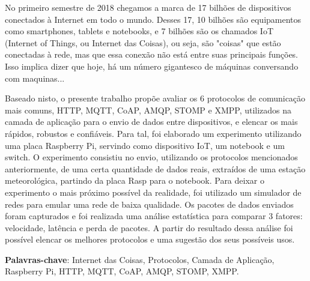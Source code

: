 \setlength{\absparsep}{18pt} %
\begin{resumo}
 
No primeiro semestre de 2018 chegamos a marca de 17 bilhões de dispositivos conectados à Internet em todo o mundo. Desses 17, 10 bilhões são equipamentos como smartphones, tablets e notebooks, e 7 bilhões são os chamados IoT (Internet of Things, ou Internet das Coisas), ou seja, são "coisas" que estão conectadas à rede, mas que essa conexão não está entre suas principais funções. Isso implica dizer que hoje, há um número gigantesco de máquinas conversando com maquinas...

Baseado nisto, o presente trabalho propõe avaliar os 6 protocolos de comunicação mais comuns, HTTP, MQTT, CoAP, AMQP, STOMP e XMPP, utilizados na camada de aplicação para o envio de dados entre dispositivos, e elencar os mais rápidos, robustos e confiáveis. Para tal, foi elaborado um experimento utilizando uma placa Raspberry Pi, servindo como dispositivo IoT, um notebook e um switch. O experimento consistiu no envio, utilizando os protocolos mencionados anteriormente, de uma certa quantidade de dados reais, extraídos de uma estação meteorológica, partindo da placa Rasp para o notebook. Para deixar o experimento o mais próximo possível da realidade, foi utilizado um simulador de redes para emular uma rede de baixa qualidade. Os pacotes de dados enviados foram capturados e foi realizada uma análise estatística para comparar 3 fatores: velocidade, latência e perda de pacotes. A partir do resultado dessa análise foi possível elencar os melhores protocolos e uma sugestão dos seus possíveis usos.

 \textbf{Palavras-chave}: Internet das Coisas, Protocolos, Camada de Aplicação, Raspberry Pi, HTTP, MQTT, CoAP, AMQP, STOMP, XMPP.
\end{resumo}

